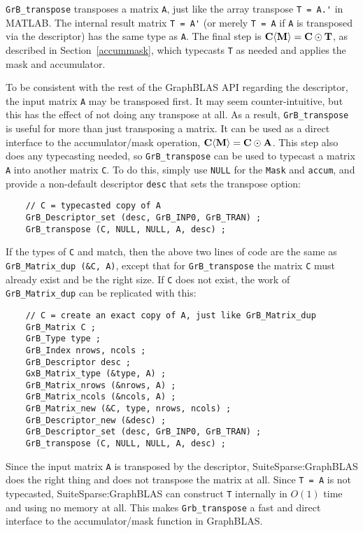 \documentclass[12pt]{article}
\begin{document}
\verb'GrB_transpose'
transposes a matrix \verb'A', just like the array transpose \verb"T = A.'" in
MATLAB.  The internal result matrix \verb"T = A'" (or merely \verb"T = A" if
\verb'A' is transposed via the descriptor) has the same type as \verb'A'.  The
final step is ${\bf C \langle M \rangle  = C \odot T}$, as described in
Section~\ref{accummask}, which typecasts \verb'T' as needed and applies the
mask and accumulator.

To be consistent with the rest of the GraphBLAS API regarding the
descriptor, the input matrix \verb'A' may be transposed first.  It may seem
counter-intuitive, but this has the effect of not doing any transpose at all.
As a result, \verb'GrB_transpose' is useful for more than just transposing a
matrix.  It can be used as a direct interface to the accumulator/mask
operation, ${\bf C \langle M \rangle  = C \odot A}$.  This step also does any
typecasting needed, so \verb'GrB_transpose' can be used to typecast a matrix
\verb'A' into another matrix \verb'C'.  To do this, simply use \verb'NULL' for
the \verb'Mask' and \verb'accum', and provide a non-default descriptor
\verb'desc' that sets the transpose option:

    {\footnotesize
    \begin{verbatim}
    // C = typecasted copy of A
    GrB_Descriptor_set (desc, GrB_INP0, GrB_TRAN) ;
    GrB_transpose (C, NULL, NULL, A, desc) ; \end{verbatim}}

If the types of \verb'C' and match, then the above two lines of code are the
same as \verb'GrB_Matrix_dup (&C, A)', except that for \verb'GrB_transpose' the
matrix \verb'C' must already exist and be the right size.  If \verb'C' does not
exist, the work of \verb'GrB_Matrix_dup' can be replicated with this:

    {\footnotesize
    \begin{verbatim}
    // C = create an exact copy of A, just like GrB_Matrix_dup
    GrB_Matrix C ;
    GrB_Type type ;
    GrB_Index nrows, ncols ;
    GrB_Descriptor desc ;
    GxB_Matrix_type (&type, A) ;
    GrB_Matrix_nrows (&nrows, A) ;
    GrB_Matrix_ncols (&ncols, A) ;
    GrB_Matrix_new (&C, type, nrows, ncols) ;
    GrB_Descriptor_new (&desc) ;
    GrB_Descriptor_set (desc, GrB_INP0, GrB_TRAN) ;
    GrB_transpose (C, NULL, NULL, A, desc) ; \end{verbatim}}

Since the input matrix \verb'A' is transposed by the descriptor,
SuiteSparse:Graph\-BLAS does the right thing and does not transpose the matrix
at all.  Since \verb'T = A' is not typecasted, SuiteSparse:GraphBLAS can
construct \verb'T' internally in $O(1)$ time and using no memory at all.   This
makes \verb'Grb_transpose' a fast and direct interface to the accumulator/mask
function in GraphBLAS.
\end{document}
